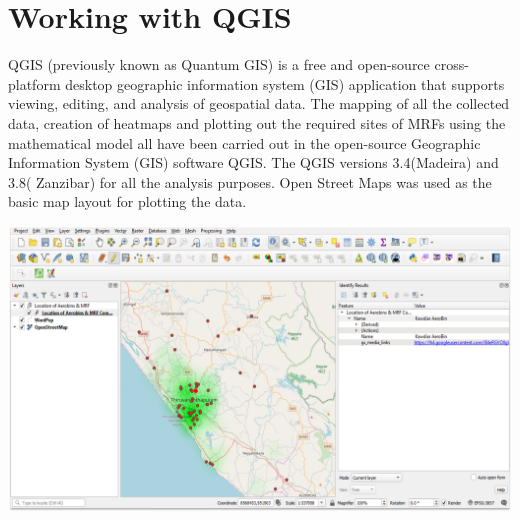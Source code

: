 \documentclass[12pt,a4paper]{report}
\begin{document}
\section{Working with QGIS} %
\begin{justify}
    QGIS (previously known as Quantum GIS) is a free and open-source cross-platform desktop geographic information system (GIS) application that supports viewing, editing, and analysis of geospatial data.
	The mapping of all the collected data, creation of heatmaps and plotting out the required sites of MRFs using the mathematical model all have been carried out in the open-source Geographic Information System (GIS)  software QGIS.
	The QGIS versions 3.4(Madeira) and 3.8( Zanzibar) for all the analysis purposes.
	Open Street Maps was used as the basic map layout for plotting the data. 
	
	\includegraphics[width=1\textwidth]{qgis_ui}
\end{justify}
	
\end{document}
